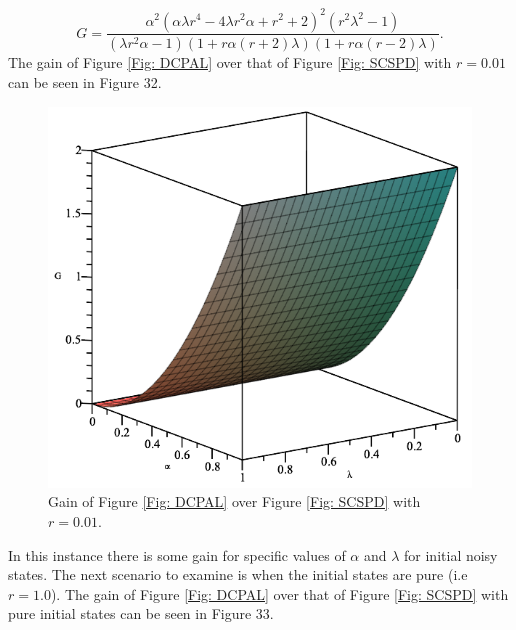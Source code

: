 \documentclass[twocolumn]{article}
\begin{document}
\begin{equation}\label{Eq: DCDALG}
G=\frac{\alpha^2(\alpha\lambda r^4-4\lambda r^2\alpha+r^2+2)^2(r^2\lambda^2-1)}{(\lambda r^2\alpha-1)(1+r\alpha(r+2)\lambda)(1+r\alpha(r-2)\lambda)}.
\end{equation}
The gain of Figure \ref{Fig: DCPAL} over that of Figure \ref{Fig: SCSPD} with $r=0.01$ can be seen in Figure 32.
\begin{figure}[ht]
    \centering
    \includegraphics[scale=0.35]{Depolarizing-Double-Channel-Alpha-and-Lambda-r=001-Gain-Graph.png}
    \caption{\footnotesize{Gain of Figure \ref{Fig: DCPAL} over Figure \ref{Fig: SCSPD} with $r=0.01$.}}
    \label{Fig: DCDALR001Gl}
\end{figure}
\par \noindent
In this instance there is some gain for specific values of $\alpha$ and $\lambda$ for initial noisy states. The next scenario to examine is when the initial states are pure (i.e $r=1.0$). The gain of Figure \ref{Fig: DCPAL} over that of Figure \ref{Fig: SCSPD} with pure initial states can be seen in Figure 33.
\end{document}
